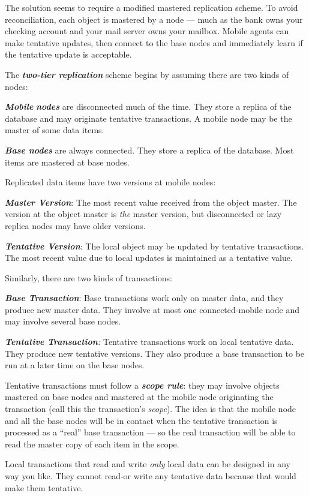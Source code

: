 \documentclass[a4paper,11pt,twoside,openright]{article}
\begin{document}
The solution seems to require a modified mastered replication scheme. To
avoid reconciliation, each object is mastered by a node --- much as the
bank owns your checking account and your mail server owns your mailbox.
Mobile agents can make tentative updates, then connect to the base nodes
and immediately learn if the tentative update is acceptable.

The \emph{\textbf{two-tier replication}} scheme begins by assuming there
are two kinds of nodes:

\emph{\textbf{Mobile}} \emph{\textbf{nodes}} are disconnected much of
the time. They store a replica of the database and may originate
tentative transactions. A mobile node may be the master of some data
items.

\emph{\textbf{Base nodes}} are always connected. They store a replica of
the database. Most items are mastered at base nodes.

Replicated data items have two versions at mobile nodes:

\emph{\textbf{Master Version}}: The most recent value received from the
object master. The version at the object master is \emph{the} master
version, but disconnected or lazy replica nodes may have older versions.

\emph{\textbf{Tentative Version}}: The local object may be updated by
tentative transactions. The most recent value due to local updates is
maintained as a tentative value.

Similarly, there are two kinds of transactions:

\emph{\textbf{Base Transaction}}: Base transactions work only on master
data, and they produce new master data. They involve at most one
connected-mobile node and may involve several base nodes.

\emph{\textbf{Tentative Transaction}:} Tentative transactions work on
local tentative data. They produce new tentative versions. They also
produce a base transaction to be run at a later time on the base nodes.

Tentative transactions must follow a \emph{\textbf{scope rule}}: they
may involve objects mastered on base nodes and mastered at the mobile
node originating the transaction (call this the transaction's
\emph{scope}). The idea is that the mobile node and all the base nodes
will be in contact when the tentative transaction is processed as a
``real'' base transaction --- so the real transaction will be able to
read the master copy of each item in the scope.

Local transactions that read and write \emph{only} local data can be
designed in any way you like. They cannot read-or write any tentative
data because that would make them tentative.
\end{document}
